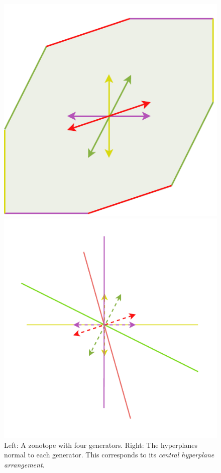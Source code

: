 \begin{figure}[!htb]
      \captionsetup{justification=centering}
      \begin{minipage}{0.49\linewidth}
        \centering
        \includegraphics[trim={0 0 0 10},clip, width=0.6\linewidth]{img/chapter_2/zonotope_edges_parallel_generator.pdf}
      \end{minipage}
      \hfill
      \begin{minipage}{0.49\linewidth}
        \centering
        \includegraphics[trim={10 50 10 50},clip,width=0.8\linewidth]{img/chapter_2/central_arrangement.pdf}
      \end{minipage}
      \caption{Left: A zonotope with four generators. Right: The hyperplanes normal to each generator. This corresponds to its \emph{central hyperplane arrangement}.}
      \label{fig:zonotope_hyperplane_arrangement}
    \end{figure}
    
